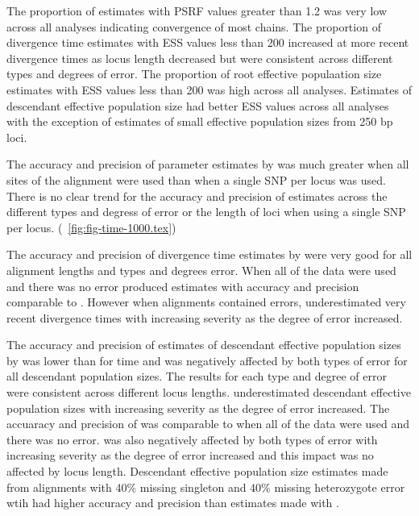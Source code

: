 The proportion of estimates with PSRF values greater than 1.2 was very low across 
all \beast analyses indicating convergence of most chains.
The proportion of \beast divergence time estimates with ESS values less than 200 
increased at more recent divergence times as locus length decreased but were 
consistent across different types and degrees of error.
The proportion of \beast root effective populaation size estimates with ESS 
values less than 200 was high across all analyses. 
Estimates of descendant effective population size had better ESS values across all 
analyses with the exception of estimates of small effective population sizes from 
250 bp loci.

The accuracy and precision of parameter estimates by \ecoevolity was much greater
when all sites of the alignment were used than when a single SNP per locus was used.  
There is no clear trend for the accuracy and precision of \ecoevolity estimates across the
different types and degress of error or the length of loci when using a single SNP per locus. 
(\fig{}~\ref{fig:fig-time-1000.tex})

The accuracy and precision of divergence time estimates by \beast were very good for all 
alignment lengths and types and degrees error. 
When all of the data were used and there was no error \ecoevolity produced 
estimates with accuracy and precision comparable to \beast. 
However when alignments contained errors, \ecoevolity underestimated very recent 
divergence times with increasing severity as the degree of error increased. 

The accuracy and precision of estimates of descendant effective population sizes 
by \beast was lower than for time and was negatively affected by both types
of error for all descendant population sizes.
The results for each type and degree of error were consistent across different 
locus lengths.
\beast underestimated descendant effective population sizes with increasing severity 
as the degree of error increased.
The accuaracy and precision of \ecoevolity was comparable to \beast when all of 
the data were used and there was no error. \ecoevolity was also negatively affected
by both types of error with increasing severity as the degree of error increased
and this impact was no affected by locus length.
Descendant effective population size estimates made from alignments with 40\%
missing singleton and 40\% missing heterozygote error wtih \beast had higher
accuracy and precision than estimates made with \ecoevolity.   

